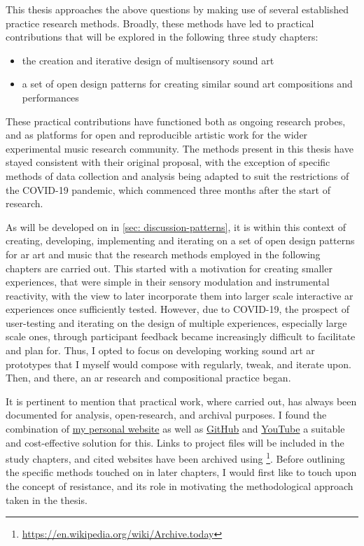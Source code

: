 This thesis approaches the above questions by making use of several established practice research methods. Broadly, these methods have led to practical contributions that will be explored in the following three study chapters: 
\begin{itemize}
    \item the creation and iterative design of multisensory sound \gls{art}
    \item a set of open design patterns for creating similar sound \gls{art} compositions and performances
\end{itemize}
These practical contributions have functioned both as ongoing research probes, and as platforms for open and reproducible artistic work for the wider experimental music research community. The methods present in this thesis have stayed consistent with their original proposal, with the exception of specific methods of data collection and analysis being adapted to suit the restrictions of the COVID-19 pandemic, which commenced three months after the start of research. 

As will be developed on in \autoref{sec: discussion-patterns}, it is within this context of creating, developing, implementing and iterating on a set of open design patterns for \gls{ar} art and music that the research methods employed in the following chapters are carried out. This started with a motivation for creating smaller experiences, that were simple in their sensory modulation and instrumental reactivity, with the view to later incorporate them into larger scale interactive \gls{ar} experiences once sufficiently tested. However, due to COVID-19, the prospect of user-testing and iterating on the design of multiple experiences, especially large scale ones, through participant feedback became increasingly difficult to facilitate and plan for. Thus, I opted to focus on developing working sound art \gls{ar} prototypes that I myself would compose with regularly, tweak, and iterate upon. Then, and there, an \gls{ar} research and compositional practice began.

It is pertinent to mention that practical work, where carried out, has always been documented for analysis, open-research, and archival purposes. I found the combination of \href{https://sambilbow.github.io}{my personal website} as well as \href{https://github.com/sambilbow}{GitHub} and \href{https://youtube.com/@sambilbow}{YouTube} a suitable and cost-effective solution for this. Links to project files will be included in the study chapters, and cited websites have been archived using  \footnote{\url{https://en.wikipedia.org/wiki/Archive.today}}. Before outlining the specific methods touched on in later chapters, I would first like to touch upon the concept of resistance, and its role in motivating the methodological approach taken in the thesis.



